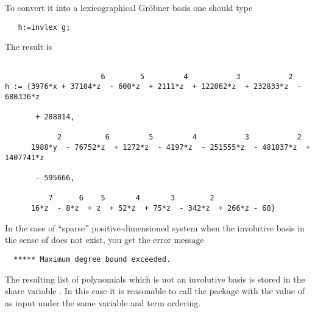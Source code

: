 \hypertarget{operator:INVLEX}{}
To convert it into a lexicographical Gr\"obner basis one should type
\begin{verbatim}
   h:=invlex g;
\end{verbatim}
The result is
\begin{verbatim}

                      6        5         4           3           2
h := {3976*x + 37104*z  - 600*z  + 2111*z  + 122062*z  + 232833*z  - 680336*z

       + 288814,

            2          6         5         4           3           2
      1988*y  - 76752*z  + 1272*z  - 4197*z  - 251555*z  - 481837*z  + 1407741*z

       - 595666,

          7      6    5       4       3        2
      16*z  - 8*z  + z  + 52*z  + 75*z  - 342*z  + 266*z - 60}

\end{verbatim}
In the case of ``sparse'' positive-dimensioned system
when the involutive basis in the sense of \cite{ZharkovBlinkov:93} does not exist,
you get the error message
\begin{verbatim}
  ***** Maximum degree bound exceeded.
\end{verbatim}
\hypertarget{variable:INVTEMPBASIS}{}
The resulting list of polynomials which is not an involutive
basis is stored in the share variable . In this case
it is reasonable to call the  package with the value of
 as input under the same variable and term ordering.

